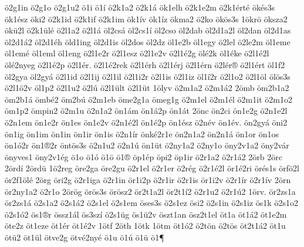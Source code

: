 {^^f62g1in
^^f62g1o
^^f62g1u2
^^f61i
^^f61^^ed
^^f62k1a2
^^f62k1^^e1
^^f6k1elh
^^f62k1e2m
^^f62k1^^e9rt^^e9
^^f6k^^e9s3s
^^f6k1^^e9sz
^^f6ki2
^^f62k1id
^^f62k1if
^^f62k1im
^^f6k1^^edv
^^f6k1^^edz
^^f6kma2
^^f62ko
^^f6k^^f6s3s
1^^f6kr^^f6
^^f6ksza2
^^f6k^^fc2l
^^f62k1^^fcl^^e9
^^f62l1a2
^^f62l1^^e1
^^f6l2cs^^e1
^^f6l2cs1^^ed
^^f6l2cso
^^f6l2dab
^^f6l2d1a2l
^^f6l2dan
^^f6l2d1as
^^f6l2d1^^e12
^^f6l2d1^^e9h
^^f6ld1ing
^^f6l2d1is
^^f6l2dos
^^f6l2dz
^^f6l1e2b
^^f6l1egy
^^f62lel
^^f62le2m
^^f6l1eme
^^f6l1em^^e9
^^f6l1eml
^^f6l1eng
^^f62l1e2r
^^f62l1esz
^^f62l1e2v
^^f62l1^^e92g
^^f6l^^e92k
^^f6l1^^e9ke
^^f62l1^^e92l
^^f6l^^e92nyeg
^^f62l1^^e92p
^^f62l1^^e9r.
^^f62l1^^e92rek
^^f62l1^^e9rh
^^f62l1^^e9rj
^^f62l1^^e9rn
^^f62l^^e9r^^ae
^^f62l1^^e9rt
^^f6l1f2
^^f6l2gya
^^f6l2gy^^e1
^^f62l1id
^^f62l1ij
^^f62l1il
^^f62l1i2r
^^f62l1is
^^f62l1iz
^^f6l1^^ed2r
^^f62l1o2
^^f62l1^^f6l
^^f6l^^f6s3s
^^f62l1^^f62v
^^f6l1p2
^^f62l1u2
^^f62l^^fa
^^f62l1^^fclt
^^f62l1^^fct
1^^f6lyv
^^f62m1a2
^^f62m1^^e12
2^^f6mb
^^f6m2b1a2
^^f6m2b1^^e1
^^f6mb^^e92
^^f6m2b^^fa
^^f62m1eb
^^f6me2g1a
^^f6meg1g
^^f62m1el
^^f62m1^^e9l
^^f62m1it
^^f62m1o2
^^f6m1p2
^^f6mpin2
^^f62m1u
^^f62n1a2
^^f6n1^^e1m
^^f6n1^^e12p
^^f6n1^^e1t
2^^f6nc
^^f6n2ci
^^f6n1e2g
^^f62n1e2l
^^f62n1em
^^f6n1e2r
^^f6n1es
^^f6n1e2v
^^f62n1^^e92l
^^f6n1^^e92p
^^f6n1^^e9sz
^^f62n^^e9v
^^f6n1^^e9v.
^^f6n2gy^^e1
^^f6ni2
^^f6n1ig
^^f6n1im
^^f6n1in
^^f6n1ir
^^f6n1is
^^f62n1^^edr
^^f6nk^^e92r1e
^^f6n2n1a2
^^f6n2n1^^e1
^^f6n1or
^^f6n1os
^^f6n1^^f32r
^^f6n1^^ae2r
^^f6nt^^f6s3s
^^f62n1u2
^^f62n1^^fa
^^f6n1^^fct
^^f62ny1a2
^^f62ny1o
^^f6ny2v1a2
^^f6ny2v^^e1r
^^f6nyves1
^^f6ny2v1^^e9g
^^f61o
^^f61^^f3
^^f61^^f6
^^f61^^ae
^^f6p1^^e9p
^^f6pi2
^^f6p1ir
^^f62r1a2
^^f62r1^^e12
2^^f6rb
2^^f6rc
2^^f6rd^^ed
2^^f6rd^^fc
1^^f62reg
^^f6re2ga
^^f6re2gu
^^f62r1el
^^f62r1er
^^f62r^^e9g
^^f62r1^^e92l
^^f6r1^^e92ri
^^f6r^^e9s1s
^^f6rf^^f62l
^^f6r2f1^^f6l^^e9
2^^f6rg
^^f6ri2g
^^f62r1iga
^^f62r1in
^^f6r1i2p
^^f62r1ir
^^f62r1is
^^f6r1i2v
^^f62r1^^edr
^^f62r1^^edv
2^^f6rn
^^f6r2ny1a2
^^f62r1o
2^^f6r^^f6g
^^f6r^^f6s3s
^^f6r^^f6sz2
^^f6r2t1a2l
^^f6r2t1^^ed2
^^f62r1u2
^^f62r1^^fa2
1^^f6rv.
^^f6r2zs1a
^^f6r2zs1^^e1
^^f62s1a2
^^f62s1^^e12
^^f62s1el
^^f62s1em
^^f6ses3s
^^f62s1ez
^^f6si2
^^f62s1in
^^f62s1iz
^^f6s1k
^^f62s1o2
^^f62s1^^f32
^^f6s1^^aer
^^f6ssz1^^e1l
^^f6s3sz^^ed
^^f62s1^^fcg
^^f6s1^^fc2v
^^f6szt1an
^^f6sz2t1el
^^f6t1a
^^f6t1^^e12
^^f6t1e2m
^^f6te2z
^^f6t1eze
^^f6t1^^e9r
^^f6t1^^e92v
1^^f6tf
2^^f6th
1^^f6tk
1^^f6tm
^^f6t1^^f32
^^f62t^^f6n
^^f62t^^f6s
^^f6t2t1^^e12
^^f6t1u
^^f6t^^fc2
^^f6t1^^fcl
^^f6tve2g
^^f6tv^^e92ny^^e9
^^f61u
^^f61^^fa
^^f61^^fc
^^f61^^b6
}
